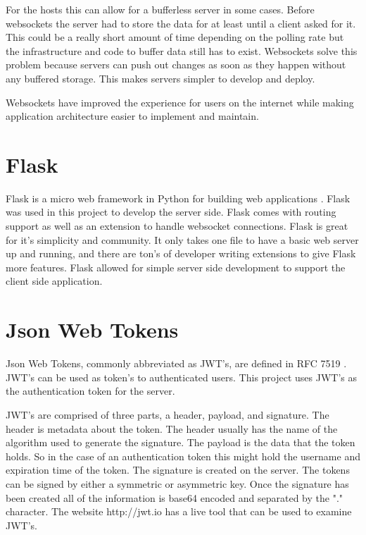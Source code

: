 For the hosts this can allow for a bufferless server in some cases. Before websockets the server had to store the data for at least until a client asked for it. This could be a really short amount of time depending on the polling rate but the infrastructure and code to buffer data still has to exist. Websockets solve this problem because servers can push out changes as soon as they happen without any buffered storage. This makes servers simpler to develop and deploy.


Websockets have improved the experience for users on the internet while making application architecture easier to implement and maintain.


\section{Flask}


Flask is a micro web framework in Python for building web applications \cite{flask}.
Flask was used in this project to develop the server side. Flask comes with routing support as well as an extension to handle websocket connections. Flask is great for it’s simplicity and community. It only takes one file to have a basic web server up and running, and there are ton’s of developer writing extensions to give Flask more features. Flask allowed for simple server side development to support the client side application.


\section{Json Web Tokens}


Json Web Tokens, commonly abbreviated as JWT’s, are defined in RFC 7519 \cite{jwt-rfc}. JWT’s can be used as token’s to authenticated users. This project uses JWT’s as the authentication token for the server.


JWT’s are comprised of three parts, a header, payload, and signature. The header is metadata about the token. The header usually has the name of the algorithm used to generate the signature. The payload is the data that the token holds. So in the case of an authentication token this might hold the username and expiration time of the token. The signature is created on the server. The tokens can be signed by either a symmetric or asymmetric key. Once the signature has been created all of the information is base64 encoded and separated by the "." character. The website http://jwt.io has a live tool that can be used to examine JWT’s. 



